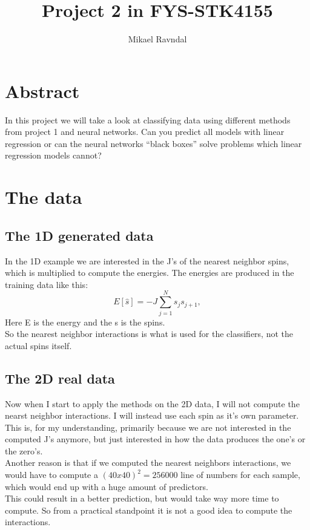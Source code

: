 \documentclass[a4paper,norsk]{article}
\title {Project 2 in FYS-STK4155}
\author {Mikael Ravndal}
\begin{document}
\maketitle
\section{Abstract}
In this project we will take a look at classifying data using different methods from project 1 and neural networks. Can you predict all models with linear regression or can the neural networks ``black boxes''  solve problems which linear regression models cannot?

\section{The data}
\subsection{The 1D generated data}
In the 1D example we are interested in the J's of the nearest neighbor spins, which is multiplied to compute the energies. The energies are produced in the training data like this:
\begin{equation*}
  E[\hat{s}]=-J\sum_{j=1}^{N}s_{j}s_{j+1},
\end{equation*}
Here E is the energy and the s is the spins.\\
So the nearest neighbor interactions is what is used for the classifiers, not the actual spins itself.
\subsection{The 2D real data}
Now when I start to apply the methods on the 2D data, I will not compute the nearst neighbor interactions. I will instead use each spin as it's own parameter. This is, for my understanding, primarily because we are not interested in the computed J's anymore, but just interested in how the data produces the one's or the zero's.\\
Another reason is that if we computed the nearest neighbors interactions, we would have to compute a $(40x40)^2 = 256000$ line of numbers for each sample, which would end up with a huge amount of predictors.\\
This could result in a better prediction, but would take way more time to compute. So from a practical standpoint it is not a good idea to compute the interactions.

\clearpage
\end{document}
